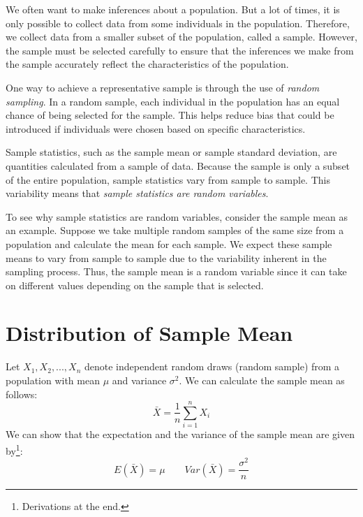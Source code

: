 \documentclass{./../../Latex/handout}
\begin{document}
\thispagestyle{plain}
\newcommand{\mytitle}{Sampling and Estimation}
\myheader{\mytitle}


We often want to make inferences about a population. But a lot of times, it is only possible to collect data from some individuals in the population. Therefore, we collect data from a smaller subset of the population, called a sample. However, the sample must be selected carefully to ensure that the inferences we make from the sample accurately reflect the characteristics of the population.

One way to achieve a representative sample is through the use of \textit{random sampling}. In a random sample, each individual in the population has an equal chance of being selected for the sample. This helps reduce bias that could be introduced if individuals were chosen based on specific characteristics.

Sample statistics, such as the sample mean or sample standard deviation, are quantities calculated from a sample of data. Because the sample is only a subset of the entire population, sample statistics vary from sample to sample. This variability means that \textit{sample statistics are random variables}.

To see why sample statistics are random variables, consider the sample mean as an example. Suppose we take multiple random samples of the same size from a population and calculate the mean for each sample. We expect these sample means to vary from sample to sample due to the variability inherent in the sampling process. Thus, the sample mean is a random variable since it can take on different values depending on the sample that is selected.

\vspace{-1em}
\section{Distribution of Sample Mean}
\vspace{-1em}

Let $X_1,X_2,...,X_n$ denote independent random draws (random sample) from a population with mean $\mu$ and variance $\sigma^2$. We can calculate the sample mean as follows:
$$ \bar{X} = \frac{1}{n} \sum_{i=1}^n X_i $$
We can show that the expectation and the variance of the sample mean are given by\footnote{Derivations at the end.}:
$$E(\bar{X}) = \mu \quad \quad Var(\bar{X}) = \frac{\sigma^2}{n} $$ 
\end{document}
